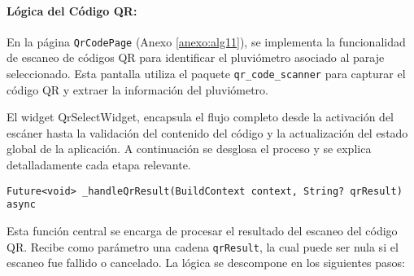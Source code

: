 \paragraph{Lógica del Código QR:}

En la página \texttt{QrCodePage} (Anexo \ref{anexo:alg11}), se implementa la funcionalidad de escaneo de códigos QR para identificar el pluviómetro asociado al paraje seleccionado. Esta pantalla utiliza el paquete \texttt{qr\_code\_scanner} para capturar el código QR y extraer la información del pluviómetro.



El widget QrSelectWidget, encapsula el flujo completo desde la activación del escáner hasta la validación del contenido del código y la actualización del estado global de la aplicación. A continuación se desglosa el proceso y se explica detalladamente cada etapa relevante.

\begin{verbatim}
Future<void> _handleQrResult(BuildContext context, String? qrResult) async
\end{verbatim}

Esta función central se encarga de procesar el resultado del escaneo del código QR. Recibe como parámetro una cadena \texttt{qrResult}, la cual puede ser nula si el escaneo fue fallido o cancelado. La lógica se descompone en los siguientes pasos:

